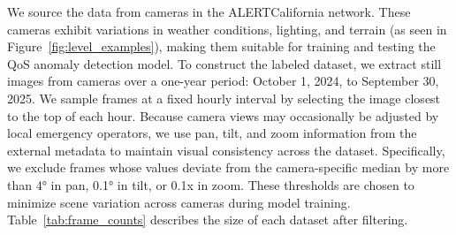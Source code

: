 \documentclass{article}
\begin{document}
We source the data from cameras in the ALERTCalifornia network. These cameras exhibit variations in weather conditions, lighting, and terrain (as seen in Figure~\ref{fig:level_examples}), making them suitable for training and testing the \Ac{QoS} anomaly detection model. To construct the labeled dataset, we extract still images from cameras over a one-year period: October 1, 2024, to September 30, 2025. We sample frames at a fixed hourly interval by selecting the image closest to the top of each hour. Because camera views may occasionally be adjusted by local emergency operators, we use pan, tilt, and zoom information from the external metadata to maintain visual consistency across the dataset. Specifically, we exclude frames whose values deviate from the camera-specific median by more than 4° in pan, 0.1° in tilt, or 0.1x in zoom. These thresholds are chosen to minimize scene variation across cameras during model training. Table~\ref{tab:frame_counts} describes the size of each dataset after filtering. 
\end{document}
